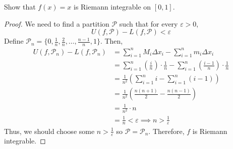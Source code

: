 \begin{theorem}{}{}
    Show that $f(x) = x$ is Riemann integrable on $[0, 1]$.
\end{theorem}
\begin{proof}
    We need to find a partition $\mathcal{P}$ such that for every $\varepsilon > 0$, $$U(f, \mathcal{P}) - L(f, \mathcal{P}) < \varepsilon$$
    Define $\mathcal{P}_n = \{0, \frac{1}{n}, \frac{2}{n}, \ldots, \frac{n - 1}{n}, 1\}$. Then,
    \begin{align*}
        U(f, \mathcal{P}_n) - L(f, \mathcal{P}_n) &= \sum_{i=1}^n M_i \Delta x_i - \sum_{i=1}^n m_i \Delta x_i \\
        &= \sum_{i=1}^n \left(\frac{i}{n}\right) \cdot \frac{1}{n} - \sum_{i=1}^n \left(\frac{i - 1}{n}\right) \cdot \frac{1}{n} \\
        &= \frac{1}{n^2} \left(\sum_{i=1}^n i - \sum_{i=1}^n (i - 1)\right) \\
        &= \frac{1}{n^2} \left(\frac{n(n + 1)}{2} - \frac{n(n - 1)}{2}\right) \\
        &= \frac{1}{n^2} \cdot n \\
        &= \frac{1}{n} < \varepsilon \implies n > \frac{1}{\varepsilon}
    \end{align*}
    Thus, we should choose some $n > \frac{1}{\varepsilon}$ so $\mathcal{P} = \mathcal{P}_n$. Therefore, $f$ is Riemann integrable.
\end{proof}